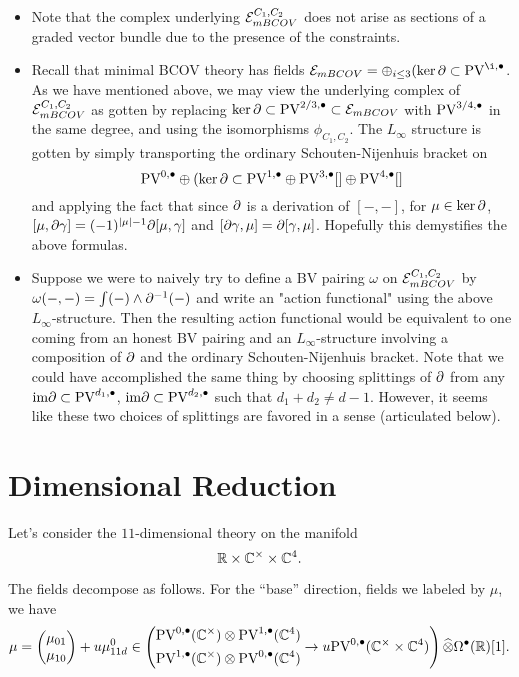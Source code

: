 \documentclass[11pt]{article}
\def\Hat{\widehat}
\begin{document}
\begin{rmk}
\begin{itemize}
\item Note that the complex underlying $\mathcal{E}_{mBCOV}^{C_1,C_2}$ does not arise as sections of a graded vector bundle due to the presence of the constraints.
\item Recall that minimal BCOV theory has fields $\mc E_{mBCOV}=\oplus_{i\leq 3} (\ker\del\subset\PV^{\i,\bullet}$. As we have mentioned above, we may view the underlying complex of $\mathcal{E}_{mBCOV}^{C_1,C_2}$ as gotten by replacing $\ker\partial\subset\text{PV}^{2/3,\bullet}\subset\mathcal{E}_{mBCOV}$ with $\text{PV}^{3/4,\bullet}$ in the same degree, and using the isomorphisms $\phi_{C_1,C_2}$. The $L_\infty$ structure is gotten by simply transporting the ordinary Schouten-Nijenhuis bracket on \[\text{PV}^{0,\bullet}\oplus(\ker\partial\subset\text{PV}^{1,\bullet}\oplus\text{PV}^{3,\bullet}[]\oplus\text{PV}^{4,\bullet}[]\] and applying the fact that since $\partial$ is a derivation of $[-,-]$, for $\mu\in\ker\partial$, $[\mu,\partial\gamma]=(-1)^{|\mu|-1}\partial[\mu,\gamma]$ and $[\partial\gamma,\mu]=\partial[\gamma,\mu]$. Hopefully this demystifies the above formulas.
\item Suppose we were to naively try to define a BV pairing $\omega$ on $\mathcal{E}_{mBCOV}^{C_1,C_2}$ by $\omega(-,-)=\int (-)\wedge\partial^{-1}(-)$ and write an "action functional" using the above $L_\infty$-structure. Then the resulting action functional would be equivalent to one coming from an honest BV pairing and an $L_\infty$-structure involving a composition of $\partial$ and the ordinary Schouten-Nijenhuis bracket. Note that we could have accomplished the same thing by choosing splittings of $\partial$ from any $\text{im}\partial\subset \text{PV}^{d_1,\bullet}$, $\text{im}\partial\subset\text{PV}^{d_2,\bullet}$ such that $d_1+d_2\neq d-1$. However, it seems like these two choices of splittings are favored in a sense (articulated below). 
\end{itemize}
\end{rmk}
\fi

\section{Dimensional Reduction}
Let's consider the $11$-dimensional theory on the manifold
\[
\mathbb{R}\times\mathbb{C}^\times\times\mathbb{C}^4 .
\]

The fields decompose as follows.
For the ``base'' direction, fields we labeled by $\mu$, we have
\[
\mu = \begin{pmatrix} \mu_{01} \\ \mu_{10} \end{pmatrix} + u \mu_{11d}^0 \in \left (\begin{aligned} & \PV^{0,\bullet}(\C^\times)\otimes\PV^{1,\bullet}(\C^4) \\ & \PV^{1,\bullet}(\C^\times)\otimes\PV^{0,\bullet}(\C^4)\end{aligned} \to u \PV^{0,\bullet}(\C^\times\times\C^4)\right ) \Hat{\otimes} \Omega^\bullet(\R) [1] .
\]
\end{document}
